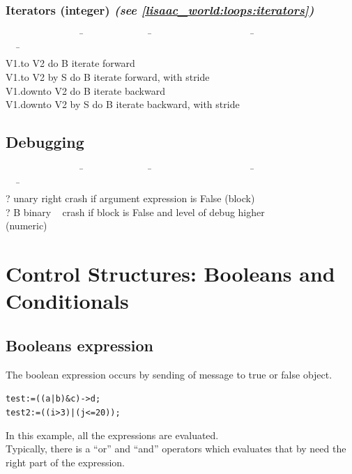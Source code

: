 \documentclass[11pt]{mybook}
\begin{document}
\subsubsection{Iterators (\sc{}integer) {\it{}(see \ref{lisaac_world:loops:iterators})}}
\label{lisaac_world:glossary:control:iterator}
\begin{tabbing}
~~~~~~~~~~~~~~~~\=~~~~~~~~~~~~~~\=~~~~~~~~~~~~~~~~~~~~~\=~~~~~~~~~~~~~~~~~~~~~~~~\=\kill\\
{V1.to V2 do B}        \> \>        \> {iterate forward}                             \\
{V1.to V2 by S do B}     \> \>        \> {iterate forward, with stride}              \\
{V1.downto V2 do B}    \> \>        \> {iterate backward}                             \\
{V1.downto V2 by S do B} \> \>        \> {iterate backward, with stride}              \\
\end{tabbing}
\subsection{Debugging}
\label{lisaac_world:glossary:debugging}
\begin{tabbing}
~~~~~~~~~~~~~~~~\=~~~~~~~~~~~~~~\=~~~~~~~~~~~~~~~~~~~~~\=~~~~~~~~~~~~~~~~~~~~~~~~\=\kill\\
{?}             \> unary  \>right \> {crash if argument expression is False ({\sc{}block})} \\
{?} B           \> binary  \>~    \> {crash if block is False and level of debug higher}\\ 
                \>         \>     \> {({\sc{}numeric})} \\
\end{tabbing}

\section{Control Structures: Booleans and Conditionals}
\label{lisaac_world:boolean_conditionals}
%
\subsection{Booleans expression} 
\label{lisaac_world:boolean_conditionals:boolean}
%
The boolean expression occurs by sending of message to {\sc{}true}
or {\sc{}false} object.
\begin{alltt} 
      test := ((a | b) & c) -> d;
      test2 := ((i>3) | (j<=20));
\end{alltt}
In this example, all the expressions are evaluated.
\\
Typically, there is a ``or'' and ``and'' operators which
evaluates that by need the right part of the expression.
\end{document}
